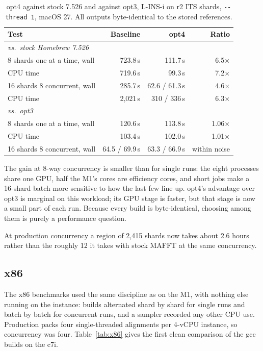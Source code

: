 \documentclass[11pt]{article}
\newcommand{\code}[1]{\texttt{#1}}
\begin{document}
\begin{table}[h]
\centering
\caption{opt4 against stock 7.526 and against opt3, L-INS-i on r2 ITS shards,
\code{-{}-thread 1}, macOS 27. All outputs byte-identical to the stored references.}
\label{tab:wall4}
\begin{tabular}{lrrr}
\toprule
Test & Baseline & opt4 & Ratio \\
\midrule
\multicolumn{4}{l}{\emph{vs.\ stock Homebrew 7.526}} \\
8 shards one at a time, wall & 723.8\,s & 111.7\,s & 6.5$\times$ \\
\quad CPU time & 719.6\,s & 99.3\,s & 7.2$\times$ \\
16 shards 8 concurrent, wall & 285.7\,s & 62.6 / 61.3\,s & 4.6$\times$ \\
\quad CPU time & 2{,}021\,s & 310 / 336\,s & 6.3$\times$ \\
\midrule
\multicolumn{4}{l}{\emph{vs.\ opt3}} \\
8 shards one at a time, wall & 120.6\,s & 113.8\,s & 1.06$\times$ \\
\quad CPU time & 103.4\,s & 102.0\,s & 1.01$\times$ \\
16 shards 8 concurrent, wall & 64.5 / 69.9\,s & 63.3 / 66.9\,s & within noise \\
\bottomrule
\end{tabular}
\end{table}

The gain at 8-way concurrency is smaller than for single runs: the eight processes share one
GPU, half the M1's cores are efficiency cores, and short jobs make a 16-shard batch more
sensitive to how the last few line up. opt4's advantage over opt3 is marginal on this
workload; its GPU stage is faster, but that stage is now a small part of each run. Because
every build is byte-identical, choosing among them is purely a performance question.

At production concurrency a region of 2{,}415 shards now takes about 2.6 hours rather than
the roughly 12 it takes with stock MAFFT at the same concurrency.

\subsection{x86}

The x86 benchmarks used the same discipline as on the M1, with nothing else running on the
instance: builds alternated shard by shard for single runs and batch by batch for concurrent
runs, and a sampler recorded any other CPU use. Production packs four single-threaded
alignments per 4-vCPU instance, so concurrency was four. Table~\ref{tab:x86} gives the
first clean comparison of the gcc builds on the c7i.
\end{document}
